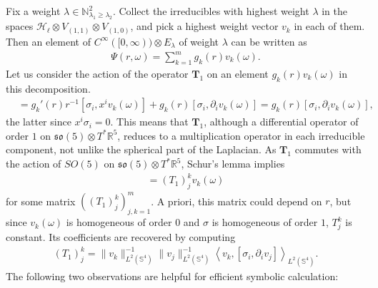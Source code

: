 \documentclass[11pt,reqno]{amsart}
\theoremstyle{remark}
\theoremstyle{definition}
\newcommand{\sov}{\mathfrak{so}(5)}
\begin{document}
Fix a weight $\lambda \in \mathbb N^2_{\lambda_1 \geq \lambda_2}$. Collect the irreducibles with highest weight $\lambda$ in the spaces $\mathcal H_\ell \otimes V_{(1,1)} \otimes V_{(1,0)}$, and pick a highest weight vector $v_k$ in each of them.
Then an element of $C^\infty([0,\infty)) \otimes E_\lambda$ of weight $\lambda$ can be written as
\begin{align*}
    \Psi(r,\omega) = \sum_{k=1}^m g_k(r) v_k(\omega).
\end{align*}
Let us consider the action of the operator $\mathbf T_1$ on an element $g_k(r) v_k(\omega)$ in this decomposition.
\begin{align*}
    [\sigma_i,\partial_i g_k(r) v_k(\omega)] &= g_k'(r)r^{-1}[\sigma_i, x^i v_k(\omega)] + g_k(r) [\sigma_i, \partial_i v_k(\omega)] = g_k(r) [\sigma_i, \partial_i v_k(\omega)],
\end{align*}
the latter since $x^i \sigma_i = 0$. This means that $\mathbf T_1$, although a differential operator of order $1$ on $\sov \otimes T^\ast \mathbb R^5$, reduces to a multiplication operator in each irreducible component, not unlike the spherical part of the Laplacian. As $\mathbf T_1$ commutes with the action of $SO(5)$ on $\sov \otimes T^\ast \mathbb R^5$, Schur's lemma implies
\begin{align*}
    [\sigma_i, \partial_i v_j(\omega)] = (T_1)^k_j v_k(\omega)
\end{align*}
for some matrix $((T_1)^k_j)_{j,k=1}^m$. A priori, this matrix could depend on $r$, but since $v_k(\omega)$ is homogeneous of order $0$ and $\sigma$ is homogeneous of order $1$, $T^k_j$ is constant. Its coefficients are recovered by computing 
\begin{align}
    \label{eq: matrix coefficient}
    (T_1)^k_j = \|v_k\|_{L^2(\mathbb S^4)}^{-1} \|v_j\|_{L^2(\mathbb S^4)}^{-1} \left\langle v_k, [\sigma_i, \partial_i v_j] \right\rangle_{L^2(\mathbb S^4)}.
\end{align}
The following two observations are helpful for efficient symbolic calculation:
\end{document}
